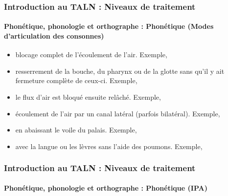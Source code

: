 \documentclass[xcolor=table]{beamer}
\begin{document}
\begin{frame}
\frametitle{Introduction au TALN : Niveaux de traitement}
\framesubtitle{Phonétique, phonologie et orthographe : Phonétique (Modes d'articulation des consonnes)}

\begin{itemize}
	\item {} blocage complet de l'écoulement de l'air.
	Exemple, \expword{\textipa{[p], [k], [b], [m], [n]}}
	
	\item {} resserrement de la bouche, du pharynx ou de la glotte sans qu'il y ait fermeture complète de ceux-ci.
	Exemple, \expword{\textipa{[f], [v], [s]}}
	
	\item {} le flux d'air est bloqué ensuite relâché.
	Exemple, \expword{\textipa{[\t{\textteshlig}]}}
	
	\item {} écoulement de l'air par un canal latéral (parfois bilatéral).
	Exemple, \expword{\textipa{[l]}}
	
	\item {} en abaissant le voile du palais.
	Exemple, \expword{\textipa{[m], [n]}}
	
	\item {} avec la langue ou les lèvres sans l'aide des poumons.
	Exemple, 
	
\end{itemize}

\end{frame}

\begin{frame}
\frametitle{Introduction au TALN : Niveaux de traitement}
\framesubtitle{Phonétique, phonologie et orthographe : Phonétique (IPA)}

\begin{center}
\end{center}

\end{frame}
\end{document}
